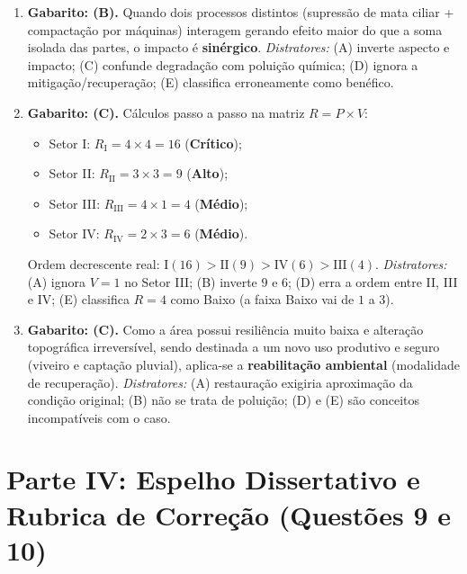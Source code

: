 \begin{boxGabarito}
\begin{enumerate}[leftmargin=1.8em, itemsep=4pt]
  \item \textbf{Gabarito: (B).} Quando dois processos distintos (supressão de mata ciliar + compactação por máquinas) interagem gerando efeito maior do que a soma isolada das partes, o impacto é \textbf{sinérgico}. \textit{Distratores:} (A) inverte aspecto e impacto; (C) confunde degradação com poluição química; (D) ignora a mitigação/recuperação; (E) classifica erroneamente como benéfico.
  \item \textbf{Gabarito: (C).} Cálculos passo a passo na matriz $R = P \times V$:
  \begin{itemize}[leftmargin=1.4em, itemsep=1pt]
    \item Setor I: $R_{\text{I}} = 4 \times 4 = 16$ (\textbf{Crítico});
    \item Setor II: $R_{\text{II}} = 3 \times 3 = 9$ (\textbf{Alto});
    \item Setor III: $R_{\text{III}} = 4 \times 1 = 4$ (\textbf{Médio});
    \item Setor IV: $R_{\text{IV}} = 2 \times 3 = 6$ (\textbf{Médio}).
  \end{itemize}
  Ordem decrescente real: $\text{I} (16) > \text{II} (9) > \text{IV} (6) > \text{III} (4)$. \textit{Distratores:} (A) ignora $V=1$ no Setor III; (B) inverte $9$ e $6$; (D) erra a ordem entre II, III e IV; (E) classifica $R = 4$ como Baixo (a faixa Baixo vai de $1$ a $3$).
  \item \textbf{Gabarito: (C).} Como a área possui resiliência muito baixa e alteração topográfica irreversível, sendo destinada a um novo uso produtivo e seguro (viveiro e captação pluvial), aplica-se a \textbf{reabilitação ambiental} (modalidade de recuperação). \textit{Distratores:} (A) restauração exigiria aproximação da condição original; (B) não se trata de poluição; (D) e (E) são conceitos incompatíveis com o caso.
\end{enumerate}
\end{boxGabarito}

\section*{Parte IV: Espelho Dissertativo e Rubrica de Correção (Questões 9 e 10)}

